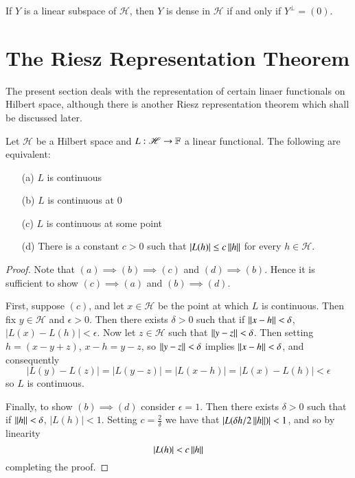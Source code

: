 \begin{cor}
    If $Y$ is a linear subspace of $\mathscr{H}$, then $Y$ is dense in $\mathscr{H}$ if and only if $Y^{\perp} = (0)$.
\end{cor}


\section{The Riesz Representation Theorem}
\label{sec:Riesz}

The present section deals with the representation of certain linaer functionals on Hilbert space, although there is another Riesz representation theorem which shall be discussed later.

\begin{prop}
    Let $\mathscr{H}$ be a Hilbert space and $L:\mathscr{H}\rightarrow \mathbb F$ a linear functional. The following are equivalent: \begin{enumerate}
        \item[(a)] $L$ is continuous 
        \item[(b)] $L$ is continuous at $0$
        \item[(c)] $L$ is continuous at some point
        \item[(d)] There is a constant $c> 0$ such that $|L(h)| \leq c\left|\left| h\right|\right|$ for every $h \in \mathscr{H}$.
    \end{enumerate}
\end{prop}
\begin{proof}
    Note that $(a)\implies (b)\implies (c)$ and $(d)\implies (b)$. Hence it is sufficient to show $(c)\implies (a)$ and $(b)\implies (d)$.

    First, suppose $(c)$, and let $x \in \mathscr{H}$ be the point at which $L$ is continuous. Then fix $y \in \mathscr{H}$ and $\epsilon > 0$. Then there exists $\delta > 0$ such that if $\left|\left| x-h\right|\right| < \delta$, $|L(x)-L(h)| < \epsilon$. Now let $z \in \mathscr{H}$ such that $\left|\left| y-z\right|\right| < \delta$. Then setting $h = (x-y+z)$, $x-h = y-z$, so $\left|\left| y-z\right|\right| < \delta$ implies $\left|\left| x-h\right|\right| < \delta$, and consequently $$|L(y) - L(z)| = |L(y-z)| = |L(x-h)| = |L(x)-L(h)| < \epsilon$$
    so $L$ is continuous.

    Finally, to show $(b)\implies (d)$ consider $\epsilon = 1$. Then there exists $\delta > 0$ such that if $\left|\left| h\right|\right| < \delta$, $|L(h)| < 1$. Setting $c = \frac{2}{\delta}$ we have that $\left|L(\delta h/2\left|\left| h\right|\right|)\right| < 1$, and so by linearity $$|L(h)| < c \left|\left| h\right|\right|$$
    completing the proof.
\end{proof}

